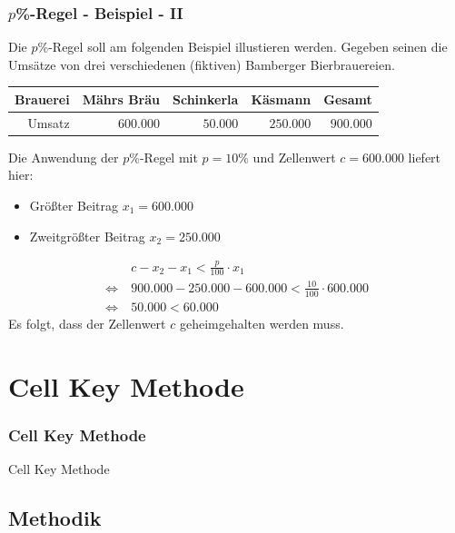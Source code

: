 \documentclass[aspectratio=169]{beamer}
\begin{document}
\begin{frame}
    \frametitle{$p$\%-Regel - Beispiel - II}
    Die $p$\%-Regel soll am folgenden Beispiel illustieren werden. Gegeben seinen die Umsätze von drei verschiedenen (fiktiven) Bamberger Bierbrauereien.
    \begin{center}
        \begin{tabular}{ r r r r r }
            \textbf{Brauerei} \vline & \textbf{Mährs Bräu} & \textbf{Schinkerla} & \textbf{Käsmann} & \textbf{Gesamt} \\ 
            \hline
            Umsatz \vline & $600.000$ & $50.000$ & $250.000$ & $900.000$
           \end{tabular}
    \end{center}
    Die Anwendung der $p$\%-Regel mit $p = 10 \%$ und Zellenwert $c = 600.000$ liefert hier:
    \begin{itemize}
        \item Größter Beitrag $x_1 = 600.000$
        \item Zweitgrößter Beitrag $x_2 = 250.000$
    \end{itemize}
    \begin{align}
        & c - x_2 - x_ 1 <  \frac{p}{100} \cdot x_1 \\
        \Leftrightarrow \: & 900.000 - 250.000 - 600.000 < \frac{10}{100} \cdot 600.000 \\
        \Leftrightarrow \: & 50.000 < 60.000
    \end{align}
    Es folgt, dass der Zellenwert $c$ geheimgehalten werden muss.
\end{frame}


\section{Cell Key Methode}

\begin{frame}{}
	\frametitle{Cell Key Methode}
    \begin{center}
        \huge Cell Key Methode
    \end{center}
\end{frame}


\subsection{Methodik}
\end{document}
